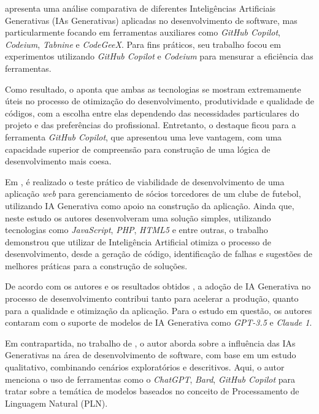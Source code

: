 \documentclass[english,brazilian]{UNISINOSartigo} %
\begin{document}
 apresenta uma análise comparativa de diferentes Inteligências Artificiais Generativas (IAs Generativas) aplicadas no desenvolvimento de software, mas particularmente focando em ferramentas auxiliares como \textit{GitHub Copilot}, \textit{Codeium}, \textit{Tabnine} e \textit{CodeGeeX}. Para fins práticos, seu trabalho focou em experimentos utilizando \textit{GitHub Copilot} e \textit{Codeium} para mensurar a eficiência das ferramentas.

Como resultado, o  aponta que ambas as tecnologias se mostram extremamente úteis no processo de otimização do desenvolvimento, produtividade e qualidade de códigos, com a escolha entre elas dependendo das necessidades particulares do projeto e das preferências do profissional. Entretanto, o destaque ficou para a ferramenta \textit{GitHub Copilot}, que apresentou uma leve vantagem, com uma capacidade superior de compreensão para construção de uma lógica de desenvolvimento mais coesa.

Em , é realizado o teste prático de viabilidade de desenvolvimento de uma aplicação \textit{web} para gerenciamento de sócios torcedores de um clube de futebol, utilizando IA Generativa como apoio na construção da aplicação. Ainda que, neste estudo os autores desenvolveram uma solução simples, utilizando tecnologias como \textit{JavaScript}, \textit{PHP}, \textit{HTML5} e entre outras, o trabalho demonstrou que utilizar de Inteligência Artificial otimiza o processo de desenvolvimento, desde a geração de código, identificação de falhas e sugestões de melhores práticas para a construção de soluções.

De acordo com os autores e os resultados obtidos \cite{daSilva2025}, a adoção de IA Generativa no processo de desenvolvimento contribui tanto para acelerar a produção, quanto para a qualidade e otimização da aplicação. Para o estudo em questão, os autores contaram com o suporte de modelos de IA Generativa como \textit{GPT-3.5} e \textit{Claude 1}.

Em contrapartida, no trabalho de , o autor aborda sobre a influência das IAs Generativas na área de desenvolvimento de software, com base em um estudo qualitativo, combinando cenários exploratórios e descritivos. Aqui, o autor menciona o uso de ferramentas como o \textit{ChatGPT}, \textit{Bard}, \textit{GitHub Copilot} para tratar sobre a temática de modelos baseados no conceito de Processamento de Linguagem Natural (PLN).
\end{document}
